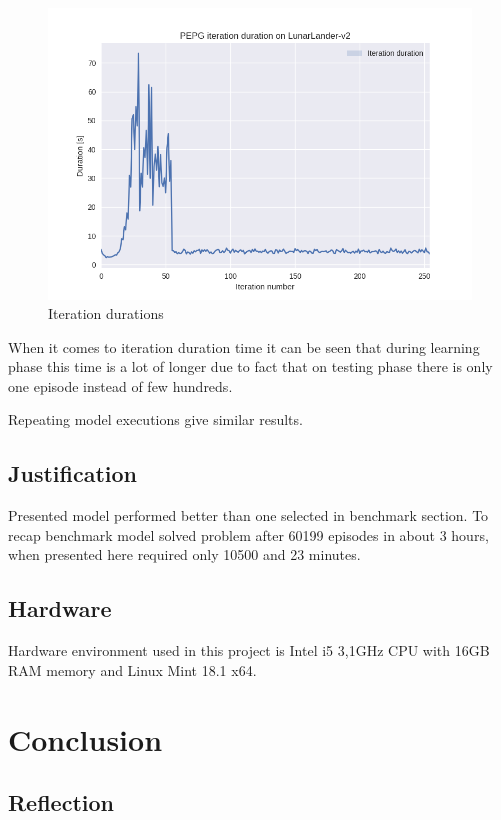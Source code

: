 \documentclass[12pt]{article}
\begin{document}
\begin{figure}[!h]
\centering
\includegraphics[scale=0.9]{final_plot_duration.png} 
\caption{Iteration durations}
\end{figure}

When it comes to iteration duration time it can be seen that during learning phase this time is a lot of longer due to fact that on testing phase there is only one episode instead of few hundreds.

Repeating model executions give similar results.

\subsection{Justification}

Presented model performed better than one selected in benchmark section. To recap benchmark model solved problem after 60199 episodes in about 3 hours, when presented here required only 10500 and 23 minutes.

\subsection{Hardware}
Hardware environment used in this project is Intel i5 3,1GHz CPU with 16GB RAM memory and Linux Mint 18.1 x64.

\section{Conclusion}
\subsection{Reflection}
\end{document}
